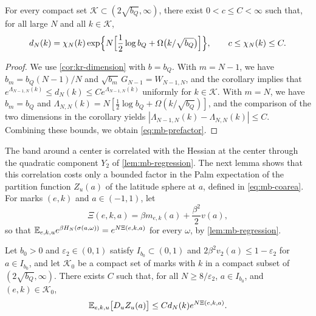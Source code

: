 \begin{lemma}\label{lem:mb-prefactor}
For every compact set $\mathcal K\subset(2\sqrt{b_Q},\infty)$, there exist $0<c\le C<\infty$ such that, for all large $N$ and all $k\in\mathcal K$,
\begin{equation}\label{eq:mb-prefactor}
d_N(k)=\chi_N(k)\exp\Bigl\{N\Bigl[\frac12\log b_Q+\Omega\bigl(k/\sqrt{b_Q}\bigr)\Bigr]\Bigr\},\qquad c\le\chi_N(k)\le C .
\end{equation}
\end{lemma}

\begin{proof}
We use \cref{cor:kr-dimension} with $b=b_Q$. With $m=N-1$, we have $b_m=b_Q(N-1)/N$ and $\sqrt{b_m}\,G_{N-1}=W_{N-1,N}$, and the corollary implies that $e^{\Lambda_{N-1,N}(k)}\le d_N(k)\le Ce^{\Lambda_{N-1,N}(k)}$ uniformly for $k\in\mathcal K$. With $m=N$, we have $b_m=b_Q$ and $\Lambda_{N,N}(k)=N[\frac12\log b_Q+\Omega(k/\sqrt{b_Q})]$, and the comparison of the two dimensions in the corollary yields $|\Lambda_{N-1,N}(k)-\Lambda_{N,N}(k)|\le C$. Combining these bounds, we obtain \eqref{eq:mb-prefactor}.
\end{proof}


The band around a center is correlated with the Hessian at the center through the quadratic component $Y_2$ of \cref{lem:mb-regression}. The next lemma shows that this correlation costs only a bounded factor in the Palm expectation of the partition function $Z_u(a)$ of the latitude sphere at $a$, defined in \eqref{eq:mb-coarea}. For marks $(e,k)$ and $a\in(-1,1)$, let
\begin{equation}\label{eq:mb-ell}
\Xi(e,k,a)=\beta m_{e,k}(a)+\frac{\beta^2}2v(a),
\end{equation}
so that $\mathbb E_{e,k,u}e^{\beta H_N(\sigma(a,\omega))}=e^{N\Xi(e,k,a)}$ for every $\omega$, by \cref{lem:mb-regression}.

\begin{lemma}\label{lem:mb-quadratic}
Let $b_0>0$ and $\varepsilon_2\in(0,1)$ satisfy $I_{b_0}\subset(0,1)$ and $2\beta^2v_2(a)\le1-\varepsilon_2$ for $a\in I_{b_0}$, and let $\mathcal K_0$ be a compact set of marks with $k$ in a compact subset of $(2\sqrt{b_Q},\infty)$. There exists $C$ such that, for all $N\ge8/\varepsilon_2$, $a\in I_{b_0}$, and $(e,k)\in\mathcal K_0$,
\begin{equation}\label{eq:mb-quadratic}
\mathbb E_{e,k,u}\bigl[D_uZ_u(a)\bigr]\le Cd_N(k)e^{N\Xi(e,k,a)} .
\end{equation}
\end{lemma}

